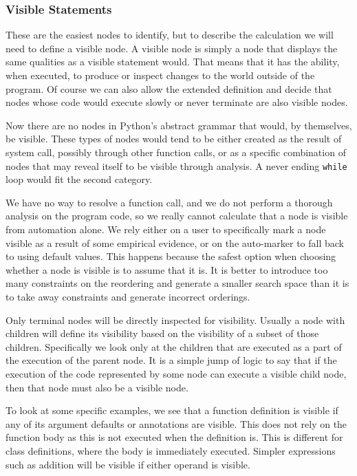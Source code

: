 \documentclass[twoside,a4paper]{report}
\begin{document}
\subsubsection{Visible Statements}

These are the easiest nodes to identify, but to describe the calculation we will need to define a visible node. A visible node is simply a node
that displays the same qualities as a visible statement would. That means that it has the ability, when executed, to produce or inspect changes to the world
outside of the program. Of course we can also allow the extended definition and decide that nodes whose code would execute slowly or never terminate
are also visible nodes.

Now there are no nodes in Python's abstract grammar that would, by themselves, be visible. These types of nodes would tend to be either created as the
result of system call, possibly through other function calls, or as a specific combination of nodes that may reveal itself to be visible through analysis.
A never ending \texttt{while} loop would fit the second category.

We have no way to resolve a function call, and we do not perform a thorough analysis on the program code, so we really cannot calculate that a node is
visible from automation alone. We rely either on a user to specifically mark a node visible as a result of some empirical evidence, or on the auto-marker
to fall back to using default values. This happens because the safest option when choosing whether a node is visible is to assume that it is. It is better to
introduce too many constraints on the reordering and generate a smaller search space than it is to take away constraints and generate incorrect orderings.

Only terminal nodes will be directly inspected for visibility. Usually a node with children will define its visibility based on the visibility of a subset
of those children. Specifically we look only at the children that are executed as a part of the execution of the parent node. It is a simple jump of logic to say
that if the execution of the code represented by some node can execute a visible child node, then that node must also be a visible node.

To look at some specific examples, we see that a function definition is visible if any of its argument defaults or annotations are visible. This does not
rely on the function body as this is not executed when the definition is. This is different for class definitions, where the body is
immediately executed. Simpler expressions such as addition will be visible if either operand is visible.
\end{document}
